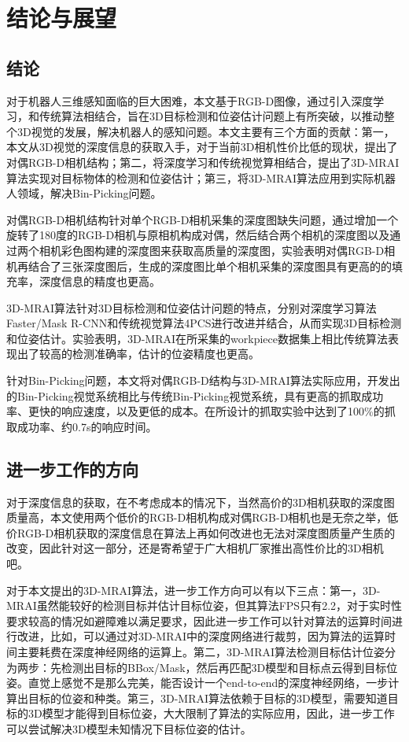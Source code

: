 \chapter{结论与展望}
\label{conclusion}
\section{结论}
对于机器人三维感知面临的巨大困难，本文基于RGB-D图像，通过引入深度学习，和传统算法相结合，旨在3D目标检测和位姿估计问题上有所突破，以推动整个3D视觉的发展，解决机器人的感知问题。本文主要有三个方面的贡献：第一，本文从3D视觉的深度信息的获取入手，对于当前3D相机性价比低的现状，提出了对偶RGB-D相机结构；第二，将深度学习和传统视觉算相结合，提出了3D-MRAI算法实现对目标物体的检测和位姿估计；第三，将3D-MRAI算法应用到实际机器人领域，解决Bin-Picking问题。

对偶RGB-D相机结构针对单个RGB-D相机采集的深度图缺失问题，通过增加一个旋转了180度的RGB-D相机与原相机构成对偶，然后结合两个相机的深度图以及通过两个相机彩色图构建的深度图来获取高质量的深度图，实验表明对偶RGB-D相机再结合了三张深度图后，生成的深度图比单个相机采集的深度图具有更高的的填充率，深度信息的精度也更高。

3D-MRAI算法针对3D目标检测和位姿估计问题的特点，分别对深度学习算法Faster/Mask R-CNN和传统视觉算法4PCS进行改进并结合，从而实现3D目标检测和位姿估计。实验表明，3D-MRAI在所采集的workpiece数据集上相比传统算法表现出了较高的检测准确率，估计的位姿精度也更高。

针对Bin-Picking问题，本文将对偶RGB-D结构与3D-MRAI算法实际应用，开发出的Bin-Picking视觉系统相比与传统Bin-Picking视觉系统，具有更高的抓取成功率、更快的响应速度，以及更低的成本。在所设计的抓取实验中达到了100\%的抓取成功率、约0.7s的响应时间。

\section{进一步工作的方向}
对于深度信息的获取，在不考虑成本的情况下，当然高价的3D相机获取的深度图质量高，本文使用两个低价的RGB-D相机构成对偶RGB-D相机也是无奈之举，低价RGB-D相机获取的深度信息在算法上再如何改进也无法对深度图质量产生质的改变，因此针对这一部分，还是寄希望于广大相机厂家推出高性价比的3D相机吧。

对于本文提出的3D-MRAI算法，进一步工作方向可以有以下三点：第一，3D-MRAI虽然能较好的检测目标并估计目标位姿，但其算法FPS只有2.2，对于实时性要求较高的情况如避障难以满足要求，因此进一步工作可以针对算法的运算时间进行改进，比如，可以通过对3D-MRAI中的深度网络进行裁剪，因为算法的运算时间主要耗费在深度神经网络的运算上。第二，3D-MRAI算法检测目标估计位姿分为两步：先检测出目标的BBox/Mask，然后再匹配3D模型和目标点云得到目标位姿。直觉上感觉不是那么完美，能否设计一个end-to-end的深度神经网络，一步计算出目标的位姿和种类。第三，3D-MRAI算法依赖于目标的3D模型，需要知道目标的3D模型才能得到目标位姿，大大限制了算法的实际应用，因此，进一步工作可以尝试解决3D模型未知情况下目标位姿的估计。

